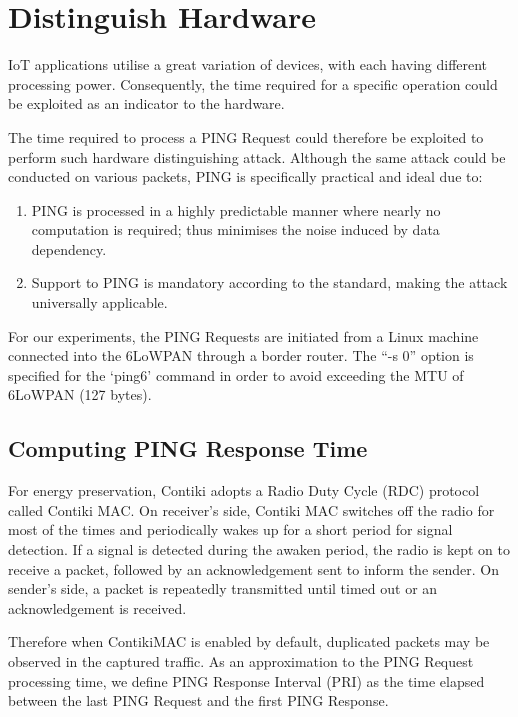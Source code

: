 \section{Distinguish Hardware}\label{Sec:DistinguishDevice}
IoT applications utilise a great variation of devices, with each having different processing power. Consequently, the time required for a specific operation could be exploited as an indicator to the hardware. 

The time required to process a PING Request could therefore be exploited to perform such hardware distinguishing attack. Although the same attack could be conducted on various packets, PING is specifically practical and ideal due to:
\begin{enumerate}
	\item PING is processed in a highly predictable manner where nearly no computation is required; thus minimises the noise induced by data dependency.
	\item Support to PING is mandatory according to the standard\cite{rfc4443}, making the attack universally applicable.
\end{enumerate}

For our experiments, the PING Requests are initiated from a Linux machine connected into the 6LoWPAN through a border router. The ``-s 0'' option is specified for the `ping6' command in order to avoid exceeding the MTU of 6LoWPAN (127 bytes). 

\subsection{Computing PING Response Time}\label{TimingWithContikiMAC}
For energy preservation, Contiki adopts a Radio Duty Cycle (RDC) protocol called Contiki MAC\cite{ContikiMAC}. On receiver's side, Contiki MAC switches off the radio for most of the times and periodically wakes up for a short period for signal detection. If a signal is detected during the awaken period, the radio is kept on to receive a packet, followed by an acknowledgement sent to inform the sender. On sender's side, a packet is repeatedly transmitted until timed out or an acknowledgement is received.

Therefore when ContikiMAC is enabled by default, duplicated packets may be observed in the captured traffic. As an approximation to the PING Request processing time, we define PING Response Interval (PRI) as the time elapsed between the last PING Request and the first PING Response.


